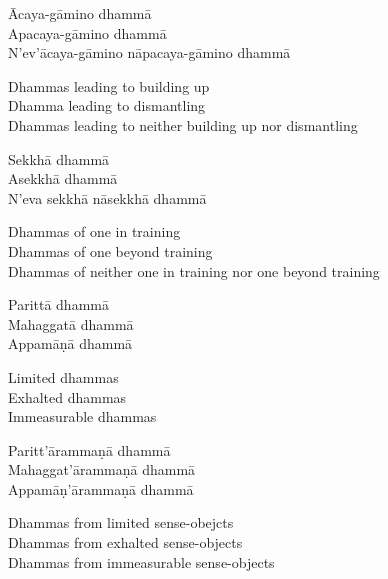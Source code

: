 \begin{pali-hang-continued}
  Ācaya-gāmino dhammā\\
  Apacaya-gāmino dhammā\\
  N'ev'ācaya-gāmino nāpacaya-gāmino dhammā
\end{pali-hang-continued}

\begin{english-verses}
  Dhammas leading to building up\\
  Dhamma leading to dismantling\\
  Dhammas leading to neither building up nor dismantling
\end{english-verses}

\begin{pali-hang-continued}
  Sekkhā dhammā\\
  Asekkhā dhammā\\
  N'eva sekkhā nāsekkhā dhammā
\end{pali-hang-continued}

\begin{english-verses}
  Dhammas of one in training\\
  Dhammas of one beyond training\\
  Dhammas of neither one in training nor one beyond training
\end{english-verses}

\begin{pali-hang-continued}
  Parittā dhammā\\
  Mahaggatā dhammā\\
  Appamāṇā dhammā
\end{pali-hang-continued}

\begin{english-verses}
  Limited dhammas\\
  Exhalted dhammas\\
  Immeasurable dhammas
\end{english-verses}

\begin{pali-hang-continued}
  Paritt'ārammaṇā dhammā\\
  Mahaggat'ārammaṇā dhammā\\
  Appamāṇ'ārammaṇā dhammā
\end{pali-hang-continued}

\begin{english-verses}
  Dhammas from limited sense-obejcts\\
  Dhammas from exhalted sense-objects\\
  Dhammas from immeasurable sense-objects
\end{english-verses}

